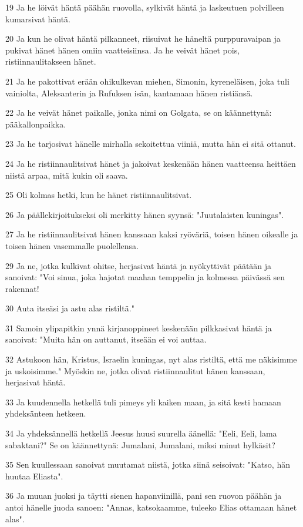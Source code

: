 \par 19 Ja he löivät häntä päähän ruovolla, sylkivät häntä ja laskeutuen polvilleen kumarsivat häntä.
\par 20 Ja kun he olivat häntä pilkanneet, riisuivat he häneltä purppuravaipan ja pukivat hänet hänen omiin vaatteisiinsa. Ja he veivät hänet pois, ristiinnaulitakseen hänet.
\par 21 Ja he pakottivat erään ohikulkevan miehen, Simonin, kyreneläisen, joka tuli vainiolta, Aleksanterin ja Rufuksen isän, kantamaan hänen ristiänsä.
\par 22 Ja he veivät hänet paikalle, jonka nimi on Golgata, se on käännettynä: pääkallonpaikka.
\par 23 Ja he tarjosivat hänelle mirhalla sekoitettua viiniä, mutta hän ei sitä ottanut.
\par 24 Ja he ristiinnaulitsivat hänet ja jakoivat keskenään hänen vaatteensa heittäen niistä arpaa, mitä kukin oli saava.
\par 25 Oli kolmas hetki, kun he hänet ristiinnaulitsivat.
\par 26 Ja päällekirjoitukseksi oli merkitty hänen syynsä: "Juutalaisten kuningas".
\par 27 Ja he ristiinnaulitsivat hänen kanssaan kaksi ryöväriä, toisen hänen oikealle ja toisen hänen vasemmalle puolellensa.
\par 29 Ja ne, jotka kulkivat ohitse, herjasivat häntä ja nyökyttivät päätään ja sanoivat: "Voi sinua, joka hajotat maahan temppelin ja kolmessa päivässä sen rakennat!
\par 30 Auta itseäsi ja astu alas ristiltä."
\par 31 Samoin ylipapitkin ynnä kirjanoppineet keskenään pilkkasivat häntä ja sanoivat: "Muita hän on auttanut, itseään ei voi auttaa.
\par 32 Astukoon hän, Kristus, Israelin kuningas, nyt alas ristiltä, että me näkisimme ja uskoisimme." Myöskin ne, jotka olivat ristiinnaulitut hänen kanssaan, herjasivat häntä.
\par 33 Ja kuudennella hetkellä tuli pimeys yli kaiken maan, ja sitä kesti hamaan yhdeksänteen hetkeen.
\par 34 Ja yhdeksännellä hetkellä Jeesus huusi suurella äänellä: "Eeli, Eeli, lama sabaktani?" Se on käännettynä: Jumalani, Jumalani, miksi minut hylkäsit?
\par 35 Sen kuullessaan sanoivat muutamat niistä, jotka siinä seisoivat: "Katso, hän huutaa Eliasta".
\par 36 Ja muuan juoksi ja täytti sienen hapanviinillä, pani sen ruovon päähän ja antoi hänelle juoda sanoen: "Annas, katsokaamme, tuleeko Elias ottamaan hänet alas".
